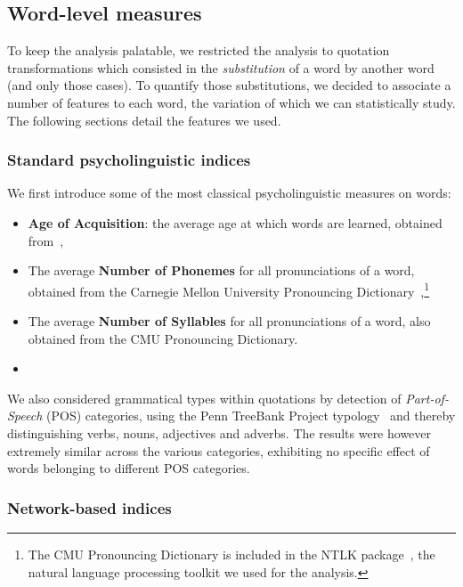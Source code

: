 \subsection{Word-level measures}

To keep the analysis palatable, we restricted the analysis to quotation transformations which consisted in the \emph{substitution} of a word by another word (and only those cases).
To quantify those substitutions, we decided to associate a number of features to each word, the variation of which we can statistically study.
The following sections detail the features we used.

\subsubsection{Standard psycholinguistic indices}

We first introduce some of the most classical psycholinguistic measures on words:

\begin{itemize}
    \item \textbf{Age of Acquisition}: the average age at which words are learned, obtained from~\citet{kuperman12},
    \item The average \textbf{Number of Phonemes} for all pronunciations of a word, obtained from the Carnegie Mellon University Pronouncing Dictionary~\citep{Weide98},\footnote{The CMU Pronouncing Dictionary is included in the NTLK package~\citep{Bird09}, the natural language processing toolkit we used for the analysis.}
    \item The average \textbf{Number of Syllables} for all pronunciations of a word, also obtained from the CMU Pronouncing Dictionary.
    \item {}
\end{itemize}

We also considered grammatical types within quotations by detection of \emph{Part-of-Speech} (POS) categories, using the Penn TreeBank Project typology~\citep{Santorini90} and thereby distinguishing verbs, nouns, adjectives and adverbs.
The results were however extremely similar across the various categories, exhibiting no specific effect of words belonging to different POS categories.

\subsubsection{Network-based indices}

